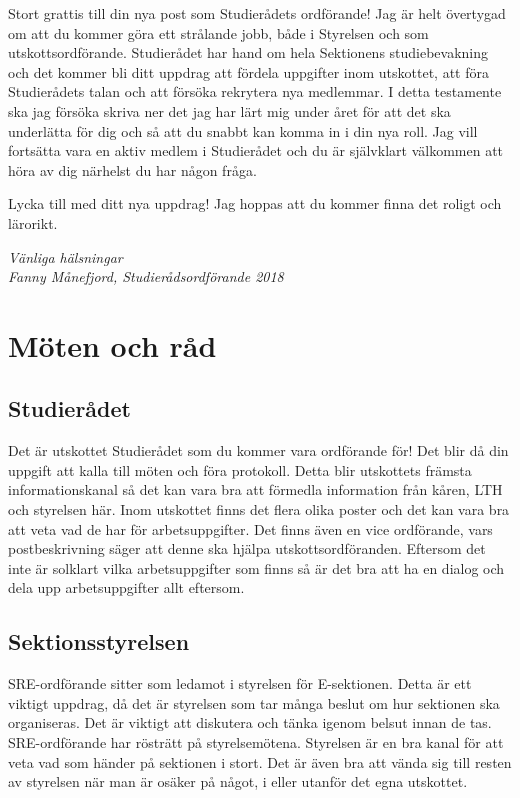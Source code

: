\documentclass[10pt]{article}
\def\docauthor{Fanny Månefjord}
\begin{document}
\heading{\doctitle}

Stort grattis till din nya post som Studierådets ordförande! Jag är helt övertygad om att du kommer göra ett strålande jobb, både i Styrelsen och som utskottsordförande. Studierådet har hand om hela Sektionens studiebevakning och det kommer bli ditt uppdrag att fördela uppgifter inom utskottet, att föra Studierådets talan och att försöka rekrytera nya medlemmar. I detta testamente ska jag försöka skriva ner det jag har lärt mig under året för att det ska underlätta för dig och så att du snabbt kan komma in i din nya roll. Jag vill fortsätta vara en aktiv medlem i Studierådet och du är självklart välkommen att höra av dig närhelst du har någon fråga.

Lycka till med ditt nya uppdrag! Jag hoppas att du kommer finna det roligt och lärorikt.

\emph{Vänliga hälsningar}\\
\emph{{\docauthor}, Studierådsordförande 2018}

\newpage

\tableofcontents

\newpage

\section{Möten och råd}

\subsection{Studierådet}
Det är utskottet Studierådet som du kommer vara ordförande för! Det blir då din uppgift att kalla till möten och föra protokoll. Detta blir utskottets främsta informationskanal så det kan vara bra att förmedla information från kåren, LTH och styrelsen här. Inom utskottet finns det flera olika poster och det kan vara bra att veta vad de har för arbetsuppgifter. Det finns även en vice ordförande, vars postbeskrivning säger att denne ska hjälpa utskottsordföranden. Eftersom det inte är solklart vilka arbetsuppgifter som finns så är det bra att ha en dialog och dela upp arbetsuppgifter allt eftersom.

\subsection{Sektionsstyrelsen}
SRE-ordförande sitter som ledamot i styrelsen för E-sektionen. Detta är ett viktigt uppdrag, då det är styrelsen som tar många beslut om hur sektionen ska organiseras. Det är viktigt att diskutera och tänka igenom belsut innan de tas. SRE-ordförande har rösträtt på styrelsemötena. Styrelsen är en bra kanal för att veta vad som händer på sektionen i stort. Det är även bra att vända sig till resten av styrelsen när man är osäker på något, i eller utanför det egna utskottet.
\end{document}
